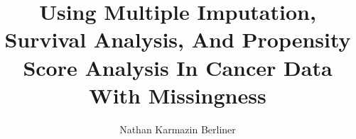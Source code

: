\documentclass[12pt]{ruthesis}
\title{Using Multiple Imputation, Survival Analysis, 
And Propensity Score Analysis In Cancer Data With Missingness}
\author{Nathan Karmazin Berliner}
\begin{document}
  \begin{frontmatter}
   \maketitle
   
   \tableofcontents
   \listoffigures
   \listoftables
  \end{frontmatter}









\begin{appendices}


\end{appendices}

%


\end{document}

